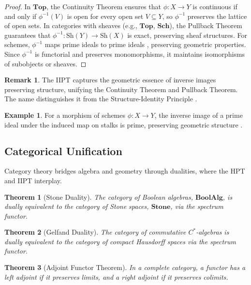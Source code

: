 \documentclass{article}
\theoremstyle{plain}
\newtheorem{theorem}{Theorem}
\theoremstyle{definition}
\newtheorem{example}{Example}
\newtheorem{remark}{Remark}
\begin{document}
\begin{proof}
In \(\mathbf{Top}\), the Continuity Theorem \cite{munkres} ensures that \(\phi: X \to Y\) is continuous if and only if \(\phi^{-1}(V)\) is open for every open set \(V \subseteq Y\), so \(\phi^{-1}\) preserves the lattice of open sets. In categories with sheaves (e.g., \(\mathbf{Top}\), \(\mathbf{Sch}\)), the Pullback Theorem \cite{kashiwara} guarantees that \(\phi^{-1}: \text{Sh}(Y) \to \text{Sh}(X)\) is exact, preserving sheaf structures. For schemes, \(\phi^{-1}\) maps prime ideals to prime ideals \cite{hart}, preserving geometric properties. Since \(\phi^{-1}\) is functorial and preserves monomorphisms, it maintains isomorphisms of subobjects or sheaves.
\end{proof}

\begin{remark}
The IIPT captures the geometric essence of inverse images preserving structure, unifying the Continuity Theorem and Pullback Theorem. The name distinguishes it from the Structure-Identity Principle \cite{mac}.
\end{remark}

\begin{example}
For a morphism of schemes \(\phi: X \to Y\), the inverse image of a prime ideal under the induced map on stalks is prime, preserving geometric structure \cite{hart}.
\end{example}

\subsection{Categorical Unification}
Category theory bridges algebra and geometry through dualities, where the HPT and IIPT interplay.

\begin{theorem}[Stone Duality]
The category of Boolean algebras, \(\mathbf{BoolAlg}\), is dually equivalent to the category of Stone spaces, \(\mathbf{Stone}\), via the spectrum functor.
\end{theorem}

\begin{theorem}[Gelfand Duality]
The category of commutative \(C^*\)-algebras is dually equivalent to the category of compact Hausdorff spaces via the spectrum functor.
\end{theorem}

\begin{theorem}[Adjoint Functor Theorem]
In a complete category, a functor has a left adjoint if it preserves limits, and a right adjoint if it preserves colimits.
\end{theorem}
\end{document}
